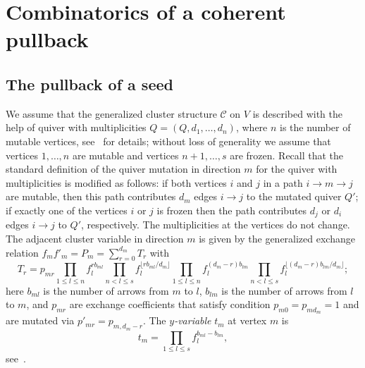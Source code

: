 \documentclass{amsart}
\theoremstyle{definition}
\theoremstyle{remark}
\numberwithin{equation}{section}
\numberwithin{theorem}{section}
\def\CC{{\mathcal C}}
\begin{document}
\section{Combinatorics of a coherent pullback}\label{combin}
\subsection{The pullback of a seed}\label{seedpullback}
We assume that the generalized cluster structure $\CC$ on $V$ is described with the help of quiver with multiplicities
$Q=(Q,d_1,\dots,d_n)$, where $n$ is the number of mutable vertices, see~\cite{GSVdouble, GSVnewdouble} for details; without loss of generality we assume that vertices $1,\dots,n$ are mutable and vertices $n+1,\dots,s$ are frozen. Recall that the standard definition of the quiver mutation in direction $m$ for the quiver with multiplicities is modified as follows: if both vertices $i$ and $j$
in a path $i\to m\to j$ are mutable, then this path contributes $d_m$ edges $i\to j$ to the mutated quiver $Q'$; if exactly one of the vertices $i$ or $j$ is frozen then the path contributes $d_j$ or $d_i$ edges $i\to j$ to $Q'$, respectively. The multiplicities at the vertices do not change.  The adjacent cluster variable in direction 
$m$ is given by the generalized exchange relation $f_mf'_m=P_m=\sum_{r=0}^{d_m}T_r$ with
\begin{equation}\label{exchange}
T_r=p_{mr}\prod_{1\le l\le n} f_l^{rb_{ml}}\prod_{n<l\le s}f_l^{\lfloor rb_{ml}/d_m\rfloor}
\prod_{1\le l\le n}f_l^{(d_m-r)b_{lm}}\prod_{n<l\le s}f_l^{\lfloor (d_m-r)b_{lm}/d_m\rfloor};
\end{equation}
here $b_{ml}$ is the number of arrows from $m$ to $l$, $b_{lm}$ is the number of arrows from $l$ to $m$, and
$p_{mr}$ are exchange coefficients that satisfy condition $p_{m0}=p_{md_m}=1$ and are mutated via 
$p'_{mr}=p_{m,d_m-r}$.  The {\it $y$-variable\/} $t_m$ at vertex $m$ is 
\[
t_m=\prod_{1\le l\le s} f_l^{b_{ml}-b_{lm}},
\]
see~\cite[Section 6.1]{GSVdouble}.
\end{document}

